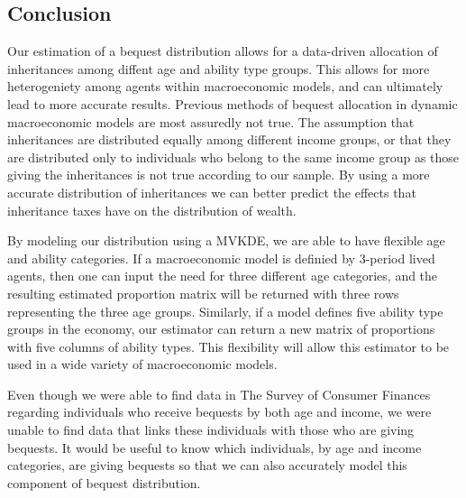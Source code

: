 \documentclass[letterpaper,12pt]{article}
\theoremstyle{definition}
\begin{document}
\begin{spacing}{1.5}
\section{Conclusion}\label{SecConclusion}

Our estimation of a bequest distribution allows for a data-driven allocation of inheritances among diffent age and ability type groups. This allows for more heterogeniety among agents within macroeconomic models, and can ultimately lead to more accurate results. Previous methods of bequest allocation in dynamic macroeconomic models are most assuredly not true. The assumption that inheritances are distributed equally among different income groups, or that they are distributed only to individuals who belong to the same income group as those giving the inheritances is not true according to our sample. By using a more accurate distribution of inheritances we can better predict the effects that inheritance taxes have on the distribution of wealth.

By modeling our distribution using a MVKDE, we are able to have flexible age and ability categories. If a macroeconomic model is definied by 3-period lived agents, then one can input the need for three different age categories, and the resulting estimated proportion matrix will be returned with three rows representing the three age groups. Similarly, if a model defines five ability type groups in the economy, our estimator can return a new matrix of proportions with five columns of ability types. This flexibility will allow this estimator to be used in a wide variety of macroeconomic models.

Even though we were able to find data in The Survey of Consumer Finances regarding individuals who receive bequests by both age and income, we were unable to find data that links these individuals with those who are giving bequests. It would be useful to know which individuals, by age and income categories, are giving bequests so that we can also accurately model this component of bequest distribution.



\clearpage


\end{spacing}


\newpage



\end{document}
